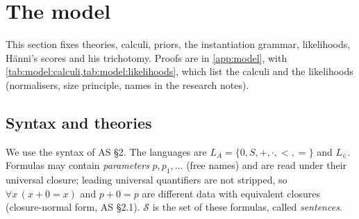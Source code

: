 \section{The model}\label{sec:model}

This section fixes theories, calculi, priors, the instantiation grammar, likelihoods, H\"anni's scores and his trichotomy. Proofs are in \cref{app:model}, with \cref{tab:model:calculi,tab:model:likelihoods}, which list the calculi and the likelihoods (normalisers, size principle, names in the research notes).

\subsection{Syntax and theories}\label{sec:model:syntax}

We use the syntax of AS \S2. The languages are $L_A=\{0,S,+,\cdot,<,=\}$ and $L_\in$. Formulas may contain \emph{parameters} $p,p_1,\dots$ (free names) and are read under their universal closure; leading universal quantifiers are not stripped, so $\forall x\,(x+0=x)$ and $p+0=p$ are different data with equivalent closures (closure-normal form, AS \S2.1). $\mathcal S$ is the set of these formulas, called \emph{sentences}.

